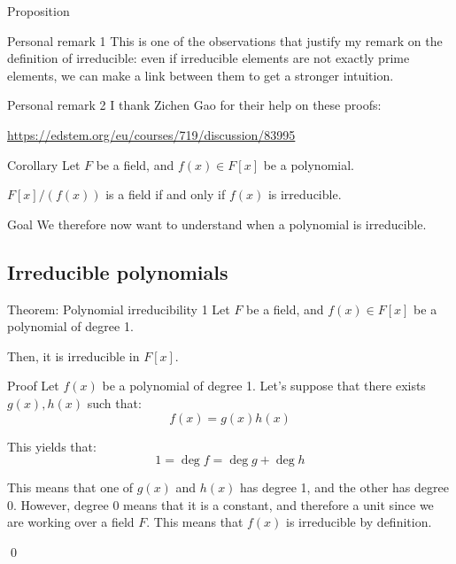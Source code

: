 \documentclass[a4paper]{article}
\begin{document}
\begin{parag}{Proposition}
\begin{subparag}{Personal remark 1}
        This is one of the observations that justify my remark on the definition of irreducible: even if irreducible elements are not exactly prime elements, we can make a link between them to get a stronger intuition.
    \end{subparag}

    \begin{subparag}{Personal remark 2}
        I thank Zichen Gao for their help on these proofs:
        \begin{center}
        \url{https://edstem.org/eu/courses/719/discussion/83995}
        \end{center}
    \end{subparag}
\end{parag}

\begin{parag}{Corollary}
    Let $F$ be a field, and $f\left(x\right) \in F\left[x\right]$ be a polynomial.

    $F\left[x\right] / \left(f\left(x\right)\right)$ is a field if and only if $f\left(x\right)$ is irreducible.

    \begin{subparag}{Goal}
        We therefore now want to understand when a polynomial is irreducible.
    \end{subparag}
\end{parag}

\subsection{Irreducible polynomials}
\begin{parag}{Theorem: Polynomial irreducibility 1}
    Let $F$ be a field, and $f\left(x\right) \in F\left[x\right]$ be a polynomial of degree 1.

    Then, it is irreducible in $F\left[x\right]$.

    \begin{subparag}{Proof}
        Let $f\left(x\right)$ be a polynomial of degree 1. Let's suppose that there exists $g\left(x\right), h\left(x\right)$ such that: 
        \[f\left(x\right) = g\left(x\right)h\left(x\right)\]
        
        This yields that:
        \[1 = \deg f = \deg g + \deg h\]
        
        This means that one of $g\left(x\right)$ and $h\left(x\right)$ has degree 1, and the other has degree 0. However, degree 0 means that it is a constant, and therefore a unit since we are working over a field $F$. This means that $f\left(x\right)$ is irreducible by definition.

        \qed
    \end{subparag}
\end{parag}
\end{document}
